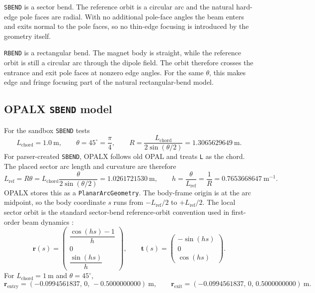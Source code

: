 \documentclass[11pt]{article}
\newcommand{\degree}{^\circ}
\newcommand{\code}[1]{\texttt{#1}}
\newcommand{\vect}[1]{\boldsymbol{#1}}
\begin{document}
\code{SBEND} is a sector bend.  The reference orbit is a circular arc and the
natural hard-edge pole faces are radial.  With no additional pole-face angles
the beam enters and exits normal to the pole faces, so no thin-edge focusing is
introduced by the geometry itself.

\code{RBEND} is a rectangular bend.  The magnet body is straight, while the
reference orbit is still a circular arc through the dipole field.  The orbit
therefore crosses the entrance and exit pole faces at nonzero edge angles.  For
the same \(\theta\), this makes edge and fringe focusing part of the natural
rectangular-bend model.

\subsection{OPALX \code{SBEND} model}

For the sandbox \code{SBEND} tests
\[
  L_\mathrm{chord} = 1.0\ \mathrm{m},\qquad
  \theta = 45\degree = \frac{\pi}{4},\qquad
  R = \frac{L_\mathrm{chord}}{2\sin(\theta/2)}
    = 1.3065629649\ \mathrm{m}.
\]
For parser-created \code{SBEND}, OPALX follows old OPAL and treats \code{L} as
the chord.  The placed sector arc length and curvature are therefore
\[
  L_\mathrm{ref} = R\theta
  = L_\mathrm{chord}\frac{\theta}{2\sin(\theta/2)}
  = 1.0261721530\ \mathrm{m},
  \qquad
  h = \frac{\theta}{L_\mathrm{ref}} = \frac{1}{R}
    = 0.7653668647\ \mathrm{m}^{-1}.
\]
OPALX stores this as a \code{PlanarArcGeometry}.  The body-frame origin is at
the arc midpoint, so the body coordinate \(s\) runs from
\(-L_\mathrm{ref}/2\) to \(+L_\mathrm{ref}/2\).  The local sector orbit is the
standard sector-bend reference-orbit convention used in first-order beam
dynamics \cite{holzer2018,bmad}:
\[
  \vect r(s) =
  \begin{pmatrix}
    \dfrac{\cos(hs)-1}{h}\\[1.0ex]
    0\\[0.5ex]
    \dfrac{\sin(hs)}{h}
  \end{pmatrix},
  \qquad
  \vect t(s) =
  \begin{pmatrix}
    -\sin(hs)\\
    0\\
    \cos(hs)
  \end{pmatrix}.
\]
For \(L_\mathrm{chord}=1\ \mathrm{m}\) and \(\theta=45\degree\),
\[
  \vect r_\mathrm{entry}
  = (-0.0994561837,\,0,\,-0.5000000000)\ \mathrm{m},
  \qquad
  \vect r_\mathrm{exit}
  = (-0.0994561837,\,0,\,0.5000000000)\ \mathrm{m}.
\]
\end{document}
